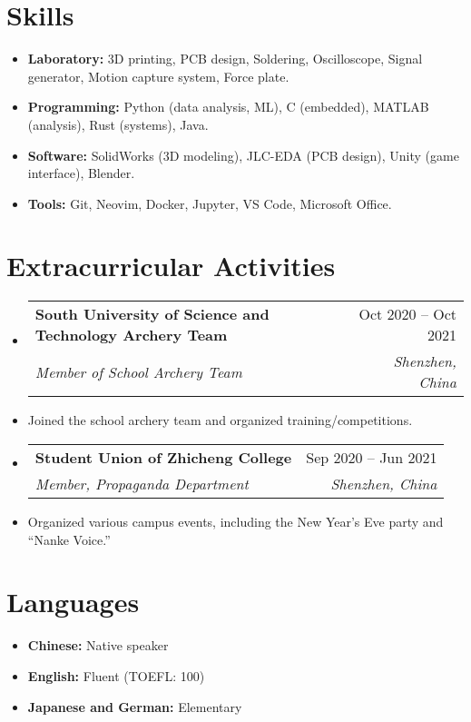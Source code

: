 \documentclass[letterpaper,11pt]{article}
\makeatletter
\newcommand{\resumeItem}[1]{
  \item\small{
    {#1 \vspace{-2pt}}
  }
}
\newcommand{\resumeSubheading}[4]{
  \vspace{-2pt}\item
  \begin{tabular*}{0.97\textwidth}[t]{l@{\extracolsep{\fill}}r}
    \textbf{#1} & #2 \\
    \textit{\small#3} & \textit{\small #4} \\
  \end{tabular*}\vspace{-7pt}
}
\newcommand{\resumeSubHeadingListStart}{\begin{itemize}[leftmargin=0.15in, label={}]}
\newcommand{\resumeSubHeadingListEnd}{\end{itemize}}
\newcommand{\resumeItemListStart}{\begin{itemize}}
\newcommand{\resumeItemListEnd}{\end{itemize}\vspace{-5pt}}
\makeatother
\begin{document}
\section{Skills}
\resumeItemListStart
\resumeItem{\textbf{Laboratory:} 3D printing, PCB design, Soldering, Oscilloscope, Signal generator,
  Motion capture system, Force plate.}
\resumeItem{\textbf{Programming:}
  Python (data analysis, ML), C (embedded), MATLAB (analysis), Rust (systems), Java.
}
\resumeItem{\textbf{Software:}
  SolidWorks (3D modeling), JLC-EDA (PCB design), Unity (game interface), Blender.
}
\resumeItem{\textbf{Tools:}
  Git, Neovim, Docker, Jupyter, VS Code, Microsoft Office.
}
\resumeItemListEnd

\section{Extracurricular Activities}
\vspace{3pt}
\resumeSubHeadingListStart

\resumeSubheading
{South University of Science and Technology Archery Team}{Oct 2020 -- Oct 2021}
{Member of School Archery Team}{Shenzhen, China}
\resumeItem{Joined the school archery team and organized training/competitions.}

\resumeSubheading
{Student Union of Zhicheng College}{Sep 2020 -- Jun 2021}
{Member, Propaganda Department}{Shenzhen, China}
\resumeItem{Organized various campus events, including the New Year's Eve party and “Nanke Voice.”}

\resumeSubHeadingListEnd

\section{Languages}
\vspace{3pt}
\resumeItemListStart
\resumeItem{\textbf{Chinese:} Native speaker}
\resumeItem{\textbf{English:} Fluent (TOEFL: 100)}
\resumeItem{\textbf{Japanese and German:} Elementary}
\resumeItemListEnd
\end{document}
